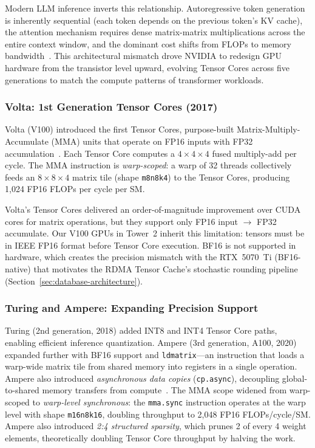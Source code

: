 \documentclass[11pt,letterpaper]{article}
\theoremstyle{definition}
\begin{document}
Modern LLM inference inverts this relationship. Autoregressive token generation is inherently sequential (each token depends on the previous token's KV cache), the attention mechanism requires dense matrix-matrix multiplications across the entire context window, and the dominant cost shifts from FLOPs to memory bandwidth~\cite{patel2025tensorcore}. This architectural mismatch drove NVIDIA to redesign GPU hardware from the transistor level upward, evolving Tensor Cores across five generations to match the compute patterns of transformer workloads.

\subsubsection{Volta: 1st Generation Tensor Cores (2017)}

Volta (V100) introduced the first Tensor Cores, purpose-built Matrix-Multiply-Accumulate (MMA) units that operate on FP16 inputs with FP32 accumulation~\cite{patel2025tensorcore}. Each Tensor Core computes a $4 \times 4 \times 4$ fused multiply-add per cycle. The MMA instruction is \emph{warp-scoped}: a warp of 32 threads collectively feeds an $8 \times 8 \times 4$ matrix tile (shape \texttt{m8n8k4}) to the Tensor Cores, producing 1,024 FP16 FLOPs per cycle per SM.

Volta's Tensor Cores delivered an order-of-magnitude improvement over CUDA cores for matrix operations, but they support only FP16 input $\to$ FP32 accumulate. Our V100 GPUs in Tower~2 inherit this limitation: tensors must be in IEEE FP16 format before Tensor Core execution. BF16 is not supported in hardware, which creates the precision mismatch with the RTX~5070~Ti (BF16-native) that motivates the RDMA Tensor Cache's stochastic rounding pipeline (Section~\ref{sec:database-architecture}).

\subsubsection{Turing and Ampere: Expanding Precision Support}

Turing (2nd generation, 2018) added INT8 and INT4 Tensor Core paths, enabling efficient inference quantization. Ampere (3rd generation, A100, 2020) expanded further with BF16 support and \texttt{ldmatrix}---an instruction that loads a warp-wide matrix tile from shared memory into registers in a single operation. Ampere also introduced \emph{asynchronous data copies} (\texttt{cp.async}), decoupling global-to-shared memory transfers from compute~\cite{patel2025tensorcore}. The MMA scope widened from warp-scoped to \emph{warp-level synchronous}: the \texttt{mma.sync} instruction operates at the warp level with shape \texttt{m16n8k16}, doubling throughput to 2,048 FP16 FLOPs/cycle/SM. Ampere also introduced \emph{2:4 structured sparsity}, which prunes 2 of every 4 weight elements, theoretically doubling Tensor Core throughput by halving the work.
\end{document}
